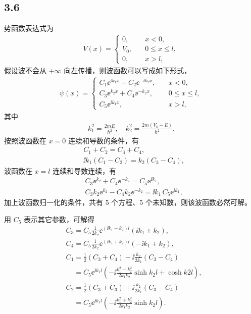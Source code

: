 \subsection{3.6}
势函数表达式为
\begin{align}
    V(x) = \begin{cases}
        0, \quad &x <0,\\
        V_0, \quad &0\leqslant x \leqslant l, \\
        0, \quad &x>l,
    \end{cases}
\end{align}
假设波不会从 $+\infty$ 向左传播，则波函数可以写成如下形式，
\begin{align}
    \psi(x) = \begin{cases}
        C_1 \ee^{\ii k_1 x} + C_2 \ee^{-\ii k_2 x}, \quad &x < 0, \\
        C_3 \ee^{k_2 x} + C_4 \ee^{-k_2 x}, \quad& 0\leqslant x \leqslant l,\\
        C_5 \ee^{\ii k_1 x}, \quad&x>l,
    \end{cases}
\end{align}
其中
\begin{align}
    k_1^2 = \frac{2mE}{\hbar^2}, \quad k_2^2 = \frac{2m(V_0 - E)}{\hbar^2}. 
\end{align}
按照波函数在 $x=0$ 连续和导数的条件，有
\begin{align}
    &C_1 + C_2 = C_3 + C_4, \\
    &\ii k_1 (C_1 - C_2) = k_2 (C_3 - C_4),
\end{align}
波函数在 $x=l$ 连续和导数连续，有
\begin{align}
    &C_3 \ee^{k_2} + C_4 \ee^{-k_2} = C_5 \ee^{\ii k_1},\\
    &C_3 k_2 \ee^{k_2} - C_4 k_2 \ee^{-k_2} = \ii k_1\, C_5 \ee^{\ii k_1},
\end{align}
加上波函数归一化的条件，共有 5 个方程、5 个未知数，则该波函数必然可解。

用 $C_5$ 表示其它参数，可解得
\begin{align}
    &C_3 = C_5 \frac1{2k_2} \ee^{(\ii k_1 - k_2)l} (\ii k_1 + k_2), \\
    &C_4 = C_5 \frac1{2k_2} \ee^{(\ii k_1 + k_2)l} (-\ii k_1 + k_2), \\
    &C_1 = \frac12(C_3 + C_4) - \ii \frac{k_2}{2k_1} (C_3 - C_4) \\
    &\phantom{C_1} = C_5 \ee^{\ii k_1 l} 
    \left(
         - \ii \frac{k_1^2 - k_2^2}{2k_1k_2} \sinh k_2 l
         + \cosh k2 l
    \right),
    \\
    &C_2 = \frac12(C_3 + C_3) + \ii \frac{k_2}{2k_1} (C_3 - C_4) \\
    &\phantom{C_2} = C_5 \ee^{\ii k_1 l} \left(
        -\ii \frac{k_1^2 + k_2^2}{2k_1k_2} \sinh k_2 l
    \right).
\end{align}

